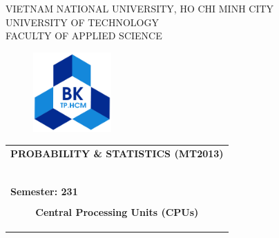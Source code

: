 \documentclass[a4paper]{article}
\begin{document}
\begin{titlepage}
\begin{center}
VIETNAM NATIONAL UNIVERSITY, HO CHI MINH CITY \\
UNIVERSITY OF TECHNOLOGY \\
FACULTY OF APPLIED SCIENCE
\end{center}

\vspace{1cm}

\begin{figure}[h!]
\begin{center}
\includegraphics[width=3cm]{graphics/hcmut.png}
\end{center}
\end{figure}

\vspace{1cm}


\begin{center}
\begin{tabular}{c}
\multicolumn{1}{l}{\textbf{{\Large PROBABILITY \& STATISTICS (MT2013)}}}\\
~~\\
\hline
\\
\multicolumn{1}{l}{\textbf{{Semester: 231}}}\\
\\
\textbf{{\Huge Central Processing Units (CPUs)}}\\
\\

\multicolumn{1}{l}{\textbf{{}}}\\
\\
\hline
\end{tabular}
\end{center}

\vspace{2cm}


\end{titlepage}
\end{document}
